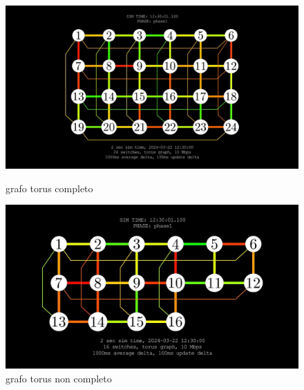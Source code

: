 \documentclass[binding=0.6cm]{sapthesis}
\begin{document}
\begin{figure}[h]
    \centering
    \begin{minipage}{0.48\textwidth}
      \includegraphics[width=\linewidth]{immagini/torus_full_24.JPG}
      \caption{grafo torus completo}
      \label{fig:torus_full_24}
    \end{minipage}\hfill
    \begin{minipage}{0.48\textwidth}
      \includegraphics[width=\linewidth]{immagini/torus_not_full_adaptive.JPG}
      \caption{grafo torus non completo}
      \label{fig:torus_not_full_adaptive}
    \end{minipage}
\end{figure}
\end{document}
